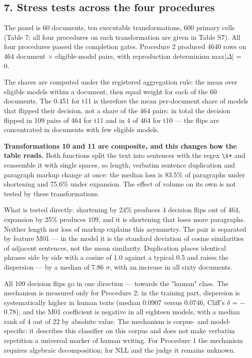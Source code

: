 \documentclass[11pt,a4paper]{article}
\renewcommand{\_}{\textunderscore\allowbreak}
\begin{document}
\subsection{7. Stress tests across the four procedures}

The panel is 60 documents, ten executable transformations, 600 primary cells
(Table 7; all four procedures on each transformation are given in Table S7).
All four procedures passed the completion gates. Procedure 2 produced 4640 rows on 464
document $\times$ eligible-model pairs, with reproduction determinism max|$\Delta$| = 0.

\setcounter{table}{6}


The shares are computed under the registered aggregation rule: the mean over
eligible models within a document, then equal weight for each of the 60
documents. The 0.451 for t11 is therefore the mean per-document share of models
that flipped their decision, not a share of the 464 pairs: in total the decision
flipped in 109 pairs of 464 for t11 and in 4 of 464 for t10 — the flips are
concentrated in documents with few eligible models.

\textbf{Transformations 10 and 11 are composite, and this changes how the table reads.}
Both functions split the text into sentences with the regex \texttt{\textbackslash{}s+} and reassemble it
with single spaces, so length, verbatim sentence duplication and paragraph
markup change at once: the median loss is 83.5\% of paragraphs under shortening and
75.6\% under expansion. The effect of volume on its own is not tested by these
transformations.

What is tested directly: shortening by 24\% produces 4 decision flips out of 464,
expansion by 25\% produces 109, and it is shortening that loses more paragraphs.
Neither length nor loss of markup explains this asymmetry. The pair is separated by
feature M01 — in the model it is the standard deviation of cosine similarities of
adjacent sentences, not the mean similarity. Duplication places identical phrases
side by side with a cosine of 1.0 against a typical 0.5 and raises the dispersion —
by a median of 7.86 $\sigma$, with an increase in all sixty documents.

All 109 decision flips go in one direction — towards the "human" class. The mechanism
is measured only for Procedure 2: in the training part, dispersion is systematically
higher in human texts (median 0.0907 versus 0.0746, Cliff's $\delta$ = $-$0.78), and the
M01 coefficient is negative in all eighteen models, with a median rank of 4 out of
22 by absolute value. The mechanism is corpus- and model-specific: it describes this
classifier on this corpus and does not make verbatim repetition a universal
marker of human writing. For Procedure 1 the mechanism requires algebraic
decomposition; for NLL and the judge it remains unknown.
\end{document}
